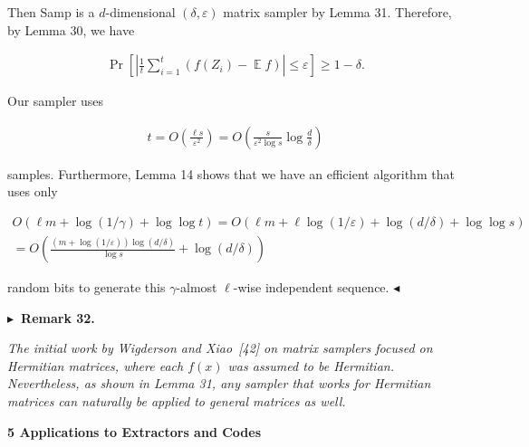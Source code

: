 \documentclass[10pt,a4paper]{article}
\begin{document}
Then Samp is a $d$-dimensional $(\delta,\varepsilon)$ matrix sampler by Lemma 31.
Therefore, by Lemma 30, we have\par


\[\begin{gathered}
\Pr\left[\left|\frac{1}{t}\sum_{i=1}^{t}(f(Z_{i})-\operatorname*{\mathbb{E}}f)\right|\leq\varepsilon\right]\geq 1-\delta.
\end{gathered}\]


Our sampler uses\par


\[\begin{gathered}
t=O\left(\frac{\ell s}{\varepsilon^{2}}\right)=O\left(\frac{s}{\varepsilon^{2}\log s}\log\frac{d}{\delta}\right)
\end{gathered}\]


samples.
Furthermore, Lemma 14 shows that we have an efficient algorithm that uses only\par


\[\begin{gathered}
\displaystyle O(\ell m+\log(1/\gamma)+\log\log t) \displaystyle=O\left(\ell m+\ell\log(1/\varepsilon)+\log(d/\delta)+\log\log s\right) \\
\displaystyle=O\left(\frac{(m+\log(1/\varepsilon))\log(d/\delta)}{\log s}+\log(d/\delta)\right)
\end{gathered}\]


random bits to generate this $\gamma$-almost $\ell$-wise independent sequence.
$\blacktriangleleft$\par





\par\medskip\noindent\textbf{
$\blacktriangleright$ Remark 32.
}\par



\emph{The initial work by Wigderson and Xiao [42] on matrix samplers focused on Hermitian matrices, where each $f(x)$ was assumed to be Hermitian. Nevertheless, as shown in Lemma 31, any sampler that works for Hermitian matrices can naturally be applied to general matrices as well.}\par










\par\medskip\noindent\textbf{
5 Applications to Extractors and Codes}\par
\end{document}
